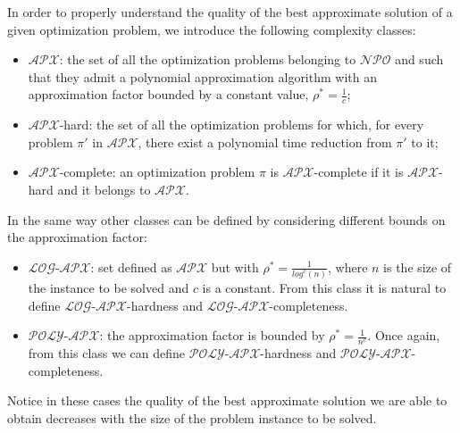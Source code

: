 In order to properly understand the quality of the best approximate solution of a given optimization problem, we introduce the following complexity classes:
\begin{itemize}
	\item $\mathcal{APX}$: the set of all the optimization problems belonging to $\mathcal{NPO}$ and such that they admit a polynomial approximation algorithm with an approximation factor bounded by a constant value, $\rho^{\ast}=\frac{1}{c}$;
	\item $\mathcal{APX}$-hard: the set of all the optimization problems for which, for every problem $\pi'$ in $\mathcal{APX}$, there exist a polynomial time reduction from $\pi'$ to it;
	\item $\mathcal{APX}$-complete: an optimization problem $\pi$ is $\mathcal{APX}$-complete if it is $\mathcal{APX}$-hard and it belongs to $\mathcal{APX}$.
\end{itemize}
In the same way other classes can be defined by considering different bounds on the approximation factor:
\begin{itemize}
	\item $\mathcal{LOG}$-$\mathcal{APX}$: set defined as $\mathcal{APX}$ but with $\rho^{\ast}=\frac{1}{log^{c}(n)}$, where $n$ is the size of the instance to be solved and $c$ is a constant. From this class it is natural to define $\mathcal{LOG}$-$\mathcal{APX}$-hardness and $\mathcal{LOG}$-$\mathcal{APX}$-completeness.
	\item $\mathcal{POLY}$-$\mathcal{APX}$: the approximation factor is bounded by $\rho^{\ast}=\frac{1}{n^{c}}$. Once again, from this class we can define $\mathcal{POLY}$-$\mathcal{APX}$-hardness and $\mathcal{POLY}$-$\mathcal{APX}$-completeness.
\end{itemize}
Notice in these cases the quality of the best approximate solution we are able to obtain decreases with the size of the problem instance to be solved.

